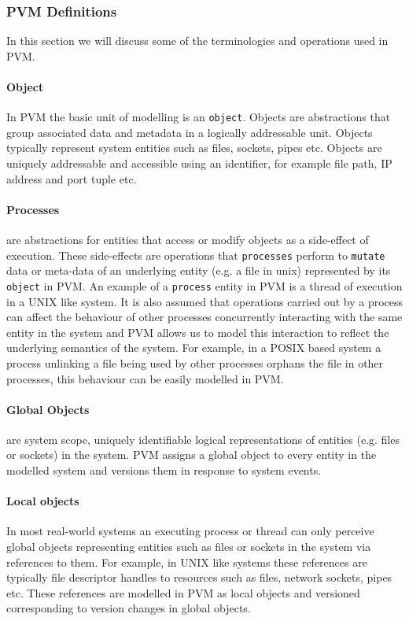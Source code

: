 \documentclass[withindex,glossary]{cam-thesis}
\begin{document}
\subsubsection{PVM Definitions}
In this section we will discuss some of the terminologies and operations used in PVM.

\paragraph{Object}
In PVM the basic unit of modelling is an \texttt{object}.
Objects are abstractions that group associated data and metadata in a logically addressable unit.
Objects typically represent system entities such as files, sockets, pipes etc.
Objects are uniquely addressable and accessible using an identifier, for example file path, IP address and port tuple etc.

\paragraph{Processes} are abstractions for entities that access or modify objects as a side-effect of execution.
These side-effects are operations that \texttt{processes} perform to \texttt{mutate} data or meta-data of an underlying entity (e.g. a file in unix) represented by its \texttt{object} in PVM.
An example of a \texttt{process} entity in PVM is a thread of execution in a UNIX like system.
It is also assumed that operations carried out by a process can affect the behaviour of other processes concurrently interacting with the same entity in the system and PVM allows us to model this interaction to reflect the underlying semantics of the system.
For example, in a POSIX based system a process unlinking a file being used by other processes orphans the file in other processes, this behaviour can be easily modelled in PVM.

\paragraph{Global Objects} are system scope, uniquely identifiable logical representations of entities (e.g. files or sockets) in the system.
PVM assigns a global object to every entity in the modelled system and versions them in response to system events.


\paragraph{Local objects}
In most real-world systems an executing process or thread can only perceive global objects representing entities such as files or sockets in the system via references to them.
For example, in UNIX like systems these references are typically file descriptor handles to resources such as files, network sockets, pipes etc.
These references are modelled in PVM as local objects and versioned corresponding to version changes in global objects.
\end{document}
